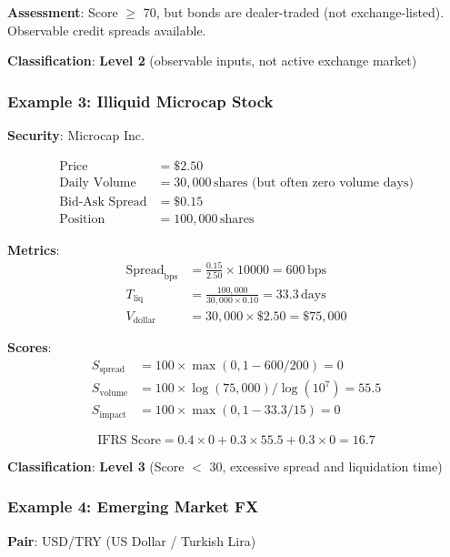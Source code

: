 \documentclass[11pt,a4paper]{article}
\begin{document}
\textbf{Assessment}: Score $\geq$ 70, but bonds are dealer-traded (not exchange-listed). Observable credit spreads available.

\textbf{Classification}: \textbf{Level 2} (observable inputs, not active exchange market)

\subsubsection{Example 3: Illiquid Microcap Stock}

\textbf{Security}: Microcap Inc.

\begin{align*}
\text{Price} &= \$2.50 \\
\text{Daily Volume} &= 30,000\,\text{shares (but often zero volume days)} \\
\text{Bid-Ask Spread} &= \$0.15 \\
\text{Position} &= 100,000\,\text{shares}
\end{align*}

\textbf{Metrics}:
\begin{align*}
\text{Spread}_{\text{bps}} &= \frac{0.15}{2.50} \times 10000 = 600\,\text{bps} \\
T_{\text{liq}} &= \frac{100,000}{30,000 \times 0.10} = 33.3\,\text{days} \\
V_{\text{dollar}} &= 30,000 \times \$2.50 = \$75,000
\end{align*}

\textbf{Scores}:
\begin{align*}
S_{\text{spread}} &= 100 \times \max(0, 1 - 600/200) = 0 \\
S_{\text{volume}} &= 100 \times \log(75,000) / \log(10^7) = 55.5 \\
S_{\text{impact}} &= 100 \times \max(0, 1 - 33.3/15) = 0
\end{align*}

\begin{equation}
\text{IFRS Score} = 0.4 \times 0 + 0.3 \times 55.5 + 0.3 \times 0 = 16.7
\end{equation}

\textbf{Classification}: \textbf{Level 3} (Score $<$ 30, excessive spread and liquidation time)

\subsubsection{Example 4: Emerging Market FX}

\textbf{Pair}: USD/TRY (US Dollar / Turkish Lira)
\end{document}
